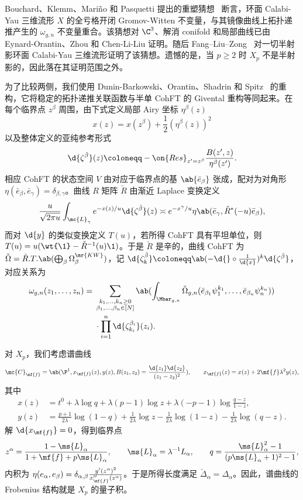 Bouchard、Klemm、Mari\~{n}o 和 Pasquetti 提出的重塑猜想~\cite{BKMP2009} 断言，环面 Calabi-Yau 三维流形 \(X\) 的全亏格开闭 Gromov-Witten 不变量，与其镜像曲线上拓扑递推产生的 \(\omega_{g,n}\) 不变量重合。该猜想对 \(\C^3\)、解消 conifold 和局部曲线已由 Eynard-Orantin、Zhou 和 Chen-Li-Liu 证明。随后 Fang--Liu--Zong~\cite{FLZ2020} 对一切半射影环面 Calabi-Yau 三维流形证明了该猜想。遗憾的是，当 \(p \geq 2\) 时 \(X_p\) 不是半射影的，因此落在其证明范围之外。

为了比较两侧，我们使用 Dunin-Barkowski、Orantin、Shadrin 和 Spitz~\cite{DOSS2014} 的重构，它将稳定的拓扑递推关联函数与半单 CohFT 的 Givental 重构等同起来。在每个临界点 \(z^{\beta}\) 周围，由下式定义局部 Airy 坐标 \(\eta^{\beta}(z)\)
\[ x(z) = x(z^{\beta}) + \frac{1}{2}(\eta^{\beta}(z))^2 \]
以及整体定义的亚纯参考形式
\[ \d{\zeta^{\bar{\beta}}}(z) \coloneqq -\on{Res}_{z'=z^{\beta}}\frac{B(z',z)}{\eta^{\beta}(z')}. \]
相应 CohFT 的状态空间 \(V\) 由对应于临界点的基 \(\ab\{\bar{e}_{\beta}\}\) 张成，配对为对角形 \(\eta(\bar{e}_{\beta},\bar{e}_{\gamma}) = \delta_{\beta,\gamma}\)。曲线 \(R\) 矩阵 \(\check{R}\) 由渐近 Laplace 变换定义
\[ \frac{u}{\sqrt{2\pi u}}\int_{\mc{L}_{\gamma}} e^{-x(z)/u}\d{\zeta^{\bar{\beta}}}(z) \asymp e^{-x^{\gamma}/u}\eta\ab(\bar{e}_{\gamma}, \check{R}^*(-u)\bar{e}_{\beta}), \]
而对 \(\d{y}\) 的类似变换定义 \(T(u)\)，若所得 CohFT 具有平坦单位，则 \(T(u) = u(\wt{\1}-\check{R}^{-1}(u)\1)\)。于是 \(\check{R}\) 是辛的，曲线 CohFT 为 \(\check{\Omega} = \check{R}.T.\ab(\bigoplus_{\beta}\Omega^{\mr{KW}}_{\beta})\)，记 \(\d{\zeta^{\bar{\beta}}_k} \coloneqq \ab(-\d{} \circ \frac{1}{\d{x}})^k \d{\zeta^{\bar{\beta}}}\)，对应关系为
\begin{align*}
    \omega_{g,n}(z_1,\ldots,z_n) ={}& \sum_{\substack{k_1,\ldots,k_n \geq 0 \\ \beta_1,\ldots,\beta_n \in [N]}}\ab(\int_{\Mbar_{g,n}} \check{\Omega}_{g,n}(\bar{e}_{\beta_1}\psi_1^{k_1},\ldots,\bar{e}_{\beta_n}\psi_n^{k_n})) \\
    &\cdot \prod_{i=1}^n \d{\zeta^{\beta_i}_{k_i}}(z_i).
\end{align*}

对 \(X_p\)，我们考虑谱曲线
\[ \mc{C}_{\mf{f}} = \ab(\P^1, x_{\mf{f}}(z), y(z), B(z_1,z_2) = \frac{\d{z_1}\d{z_2}}{(z_1-z_2)^2}), \qquad x_{\mf{f}}(z) = x(z) + 2\mf{f}\lambda^2 y(z), \]
其中
\begin{align*}
    x(z) &= t^0 + \lambda \log q + \lambda(p-1)\log z + \lambda(-p-1)\log\frac{q-z}{1-z}, \\
    y(z) &= \frac{p+1}{2\lambda}\log(1-q) + \frac{1}{2\lambda}\log z - \frac{1}{2\lambda}\log(1-z) - \frac{1}{2\lambda}\log(q-z).
\end{align*}
解 \(\d{x_{\mf{f}}} = 0\)，得到临界点
\[ z^{\alpha} = \frac{1-\ms{L}_{\alpha}}{1+\mf{f}+p\ms{L}_{\alpha}}, \qquad \ms{L}_{\alpha} = \lambda^{-1}L_{\alpha}, \qquad q = \frac{\ms{L}_{\alpha}^2-1}{(p\ms{L}_{\alpha}+1)^2-1}, \]
内积为 \(\eta(e_{\alpha},e_{\beta}) = \delta_{\alpha,\beta}\frac{y'(z^{\alpha})^2}{x''_{\mf{f}}(z^{\alpha})}\)。于是所得长度满足 \(\check{\Delta}_{\alpha} = \Delta_{\alpha}\)。因此，谱曲线的 Frobenius 结构就是 \(X_p\) 的量子积。


